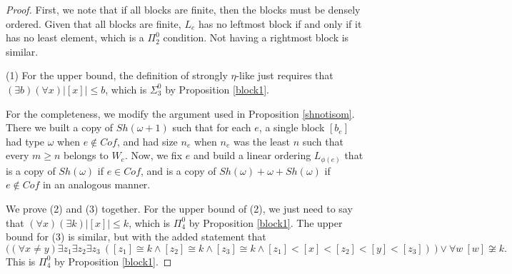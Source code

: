 \documentclass[11pt]{amsart}
\theoremstyle{definition}
\begin{document}
\begin{proof} First, we note that if all blocks are finite, then the blocks must be densely ordered. Given that all blocks are finite, $L_e$ has no leftmost block if and only if it has no least element, which is a $\Pi^0_2$ condition.
Not having a rightmost block is similar. 
 
(1) For the upper bound, the definition of strongly $\eta$-like just requires that $(\exists b)(\forall x)|[x]| \leq b$, which is $\Sigma^0_3$ by Proposition \ref{block1}. 

For the completeness, we modify the argument used in Proposition \ref{shnotisom}. There we built a copy of $Sh(\omega+1)$ such that for each $e$, a single block $[b_e]$ had type $\omega$ when $e \notin Cof$, and had size $n_e$ when $n_e$ was the least $n$ such that every $m \geq n$ belongs to $W_e$. Now, we fix $e$ and build a linear ordering $L_{\phi(e)}$ that is a copy of $Sh(\omega)$ if $e \in Cof$, and is a copy of $Sh(\omega)+\omega+Sh(\omega)$ if $e \notin Cof$ in an analogous manner.  





\medskip

We prove (2) and (3) together.
For the upper bound of (2), we just need to say that $(\forall x)(\exists k)|[x]| \leq k$, which is $\Pi^0_4$ by Proposition \ref{block1}. 
The upper bound for (3) is similar, but with the added statement that 
\[\Big((\forall x\neq y)\exists z_1 \exists z_2 \exists z_3 ~( [z_1]\cong k \land [z_2]\cong k \land [z_3]\cong k \land [z_1]<[x]<[z_2]<[y]<[z_3])\ \Big)\lor \forall w ~ [w]\not\cong k.\]
This is $\Pi_4^0$ by Proposition \ref{block1}.


\end{proof}
\end{document}
